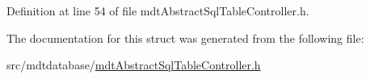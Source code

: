 Definition at line 54 of file mdt\-Abstract\-Sql\-Table\-Controller.\-h.



The documentation for this struct was generated from the following file\-:\begin{DoxyCompactItemize}
\item 
src/mdtdatabase/\hyperlink{mdt_abstract_sql_table_controller_8h}{mdt\-Abstract\-Sql\-Table\-Controller.\-h}\end{DoxyCompactItemize}
